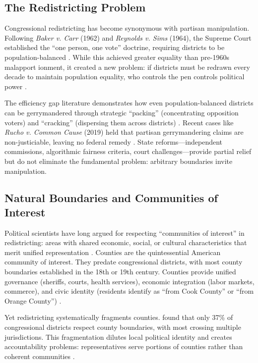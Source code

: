 \subsection{The Redistricting Problem}

Congressional redistricting has become synonymous with partisan manipulation. Following \emph{Baker v. Carr} (1962) and \emph{Reynolds v. Sims} (1964), the Supreme Court established the ``one person, one vote'' doctrine, requiring districts to be population-balanced \citep{baker1962carr, reynolds1964sims}. While this achieved greater equality than pre-1960s malapport ionment, it created a new problem: if districts must be redrawn every decade to maintain population equality, who controls the pen controls political power \citep{stephanopoulos2015partisan}.

The efficiency gap literature demonstrates how even  population-balanced districts can be gerrymandered through strategic ``packing'' (concentrating opposition voters) and ``cracking'' (dispersing them across districts) \citep{stephanopoulos2015partisan, mcghee2014measuring}. Recent cases like \emph{Rucho v. Common Cause} (2019) held that partisan gerrymandering claims are non-justiciable, leaving no federal remedy \citep{rucho2019}. State reforms---independent commissions, algorithmic fairness criteria, court challenges---provide partial relief but do not eliminate the fundamental problem: arbitrary boundaries invite manipulation.

\subsection{Natural Boundaries and Communities of Interest}

Political scientists have long argued for respecting ``communities of interest'' in redistricting: areas with shared economic, social, or cultural characteristics that merit unified representation \citep{morrill1981political}. Counties are the quintessential American community of interest. They predate congressional districts, with most county boundaries established in the 18th or 19th century. Counties provide unified governance (sheriffs, courts, health services), economic integration (labor markets, commerce), and civic identity (residents identify as ``from Cook County'' or ``from Orange County'') \citep{benton2002counties}.

Yet redistricting systematically fragments counties. \citet{altman2005contiguity} found that only 37\% of congressional districts respect county boundaries, with most crossing multiple jurisdictions. This fragmentation dilutes local political identity and creates accountability problems: representatives serve portions of counties rather than coherent communities \citep{butler2016local}.

